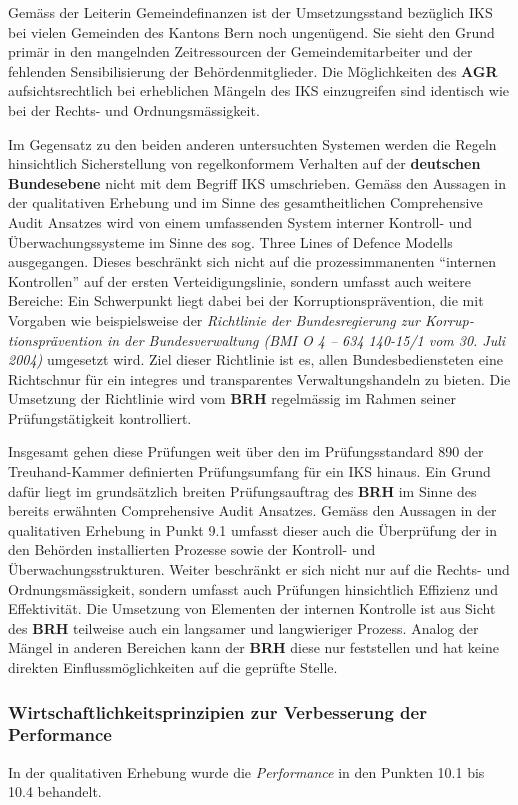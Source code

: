 \documentclass[10pt]{article}
\begin{document}
Gemäss der Leiterin Gemeindefinanzen ist der Umsetzungsstand bezüglich IKS bei vielen Gemeinden des Kantons Bern noch ungenügend. Sie sieht den Grund primär in den mangelnden Zeitressourcen der Gemeindemitarbeiter und der fehlenden Sensibilisierung der Behördenmitglieder. Die Möglichkeiten des \textbf{AGR }aufsichtsrechtlich bei erheblichen Mängeln des IKS einzugreifen sind identisch wie bei der Rechts- und Ordnungs­mässigkeit.

Im Gegensatz zu den beiden anderen untersuchten Systemen werden die Regeln hin­sichtlich Sicherstellung von regelkonformem Verhalten auf der \textbf{deutschen Bundes­ebene} nicht mit dem Begriff IKS umschrieben. Gemäss den Aussagen in der qualitativen Erhe­bung und im Sinne des gesamtheitlichen Comprehensive Audit Ansatzes wird von einem umfassenden System interner Kontroll- und Überwachungssysteme im Sinne des sog. Three Lines of Defence Modells ausgegangen. Dieses beschränkt sich nicht auf die prozessimmanenten “{}internen Kontrollen”{} auf der ersten Verteidigungslinie, sondern umfasst auch weitere Bereiche: Ein Schwer­punkt liegt dabei bei der Korruptions­präven­tion, die mit Vorgaben wie beispielsweise der \textit{Richtlinie der Bundesregierung zur Korrup­tionsprävention in der Bundesverwaltung (BMI O 4 -- 634 140-15/1 vom 30. Juli 2004)} umgesetzt wird. Ziel dieser Richtlinie ist es, allen Bundesbediensteten eine Richtschnur für ein integres und transparentes Verwaltungs­handeln zu bieten. Die Umsetzung der Richtlinie wird vom \textbf{BRH} regelmässig im Rahmen seiner Prüfungstätigkeit kontrolliert.

Insgesamt gehen diese Prüfungen weit über den im Prüfungsstandard 890 der Treuhand-Kammer definierten Prüfungsumfang für ein IKS hinaus. Ein Grund dafür liegt im grundsätzlich breiten Prüfungsauftrag des \textbf{BRH} im Sinne des bereits erwähnten Comprehensive Audit Ansatzes. Gemäss den Aussagen in der qualitativen Erhebung in Punkt 9.1 umfasst dieser auch die Überprüfung der in den Behörden installierten Prozesse sowie der Kontroll- und Überwachungsstrukturen. Weiter beschränkt er sich nicht nur auf die Rechts- und Ordnungsmässigkeit, sondern umfasst auch Prüfungen hinsichtlich Effizienz und Effektivität. Die Umsetzung von Elementen der internen Kontrolle ist aus Sicht des \textbf{BRH} teilweise auch ein langsamer und langwieriger Prozess. Analog der Mängel in anderen Bereichen kann der \textbf{BRH} diese nur feststellen und hat keine direkten Einflussmöglichkeiten auf die geprüfte Stelle.

\subsubsection{Wirtschaftlichkeitsprinzipien zur Verbesserung der Performance}\label{subsubsec:wirtschaftlichkeitsprinzipien_zur_verbesserung_der_performance}
In der qualitativen Erhebung wurde die \textit{Performance} in den Punkten 10.1 bis 10.4 behandelt.
\end{document}
